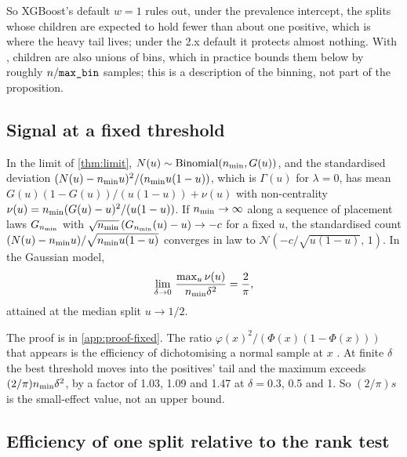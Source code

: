So XGBoost's default $w = 1$ rules out, under the prevalence intercept, the splits whose children are expected to hold fewer than about one positive, which is where the heavy tail lives; under the 2.x default it protects almost nothing. With , children are also unions of bins, which in practice bounds them below by roughly $n/\texttt{max\_bin}$ samples; this is a description of the binning, not part of the proposition.

\subsection{Signal at a fixed threshold}\label{app:fixed}

\begin{proposition}\label{prop:fixed}
In the limit of \cref{thm:limit}, $N(u) \sim \operatorname{Binomial}(n_{\min}, G(u))$, and the standardised deviation $(N(u)-n_{\min} u)^2/(n_{\min} u(1-u))$, which is $\Gamma(u)$ for $\lambda = 0$, has mean $G(u)(1-G(u))/(u(1-u)) + \nu(u)$ with non-centrality $\nu(u) = n_{\min} (G(u)-u)^2/(u(1-u))$. If $n_{\min} \to \infty$ along a sequence of placement laws $G_{n_{\min}}$ with $\sqrt{n_{\min}}\,(G_{n_{\min}}(u) - u) \to -c$ for a fixed $u$, the standardised count $(N(u) - n_{\min} u)/\sqrt{n_{\min} u(1-u)}$ converges in law to $\mathcal N(-c/\sqrt{u(1-u)},\,1)$. In the Gaussian model,
\begin{equation}\label{eq:twopi}
  \lim_{\delta\to 0}\, \frac{\max_u \nu(u)}{n_{\min}\delta^2} = \frac{2}{\pi},
\end{equation}
attained at the median split $u \to 1/2$.
\end{proposition}

The proof is in \cref{app:proof-fixed}. The ratio $\varphi(x)^2/(\Phi(x)(1-\Phi(x)))$ that appears is the efficiency of dichotomising a normal sample at $x$ \citep{cox1957note}. At finite $\delta$ the best threshold moves into the positives' tail and the maximum exceeds $(2/\pi)n_{\min}\delta^2$, by a factor of 1.03, 1.09 and 1.47 at $\delta = 0.3$, 0.5 and 1. So $(2/\pi)s$ is the small-effect value, not an upper bound.

\subsection{Efficiency of one split relative to the rank test}\label{app:efficiency}

